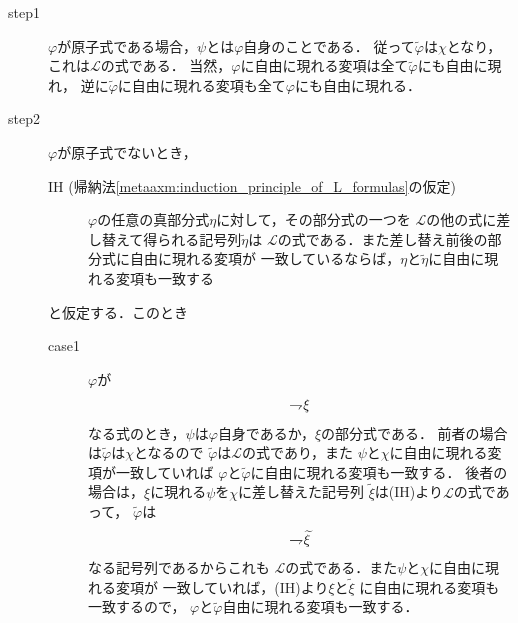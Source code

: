 	\begin{metaprf}\mbox{}
		\begin{description}
			\item[step1] $\varphi$が原子式である場合，$\psi$とは$\varphi$自身のことである．
				従って$\widetilde{\varphi}$は$\chi$となり，これは$\mathcal{L}$の式である．
				当然，$\varphi$に自由に現れる変項は全て$\widetilde{\varphi}$にも自由に現れ，
				逆に$\widetilde{\varphi}$に自由に現れる変項も全て$\varphi$にも自由に現れる．
							
			\item[step2] $\varphi$が原子式でないとき，
				\begin{description}
					\item[IH (帰納法\ref{metaaxm:induction_principle_of_L_formulas}の仮定)]
						$\varphi$の任意の真部分式$\eta$に対して，その部分式の一つを
						$\mathcal{L}$の他の式に差し替えて得られる記号列$\widetilde{\eta}$は
						$\mathcal{L}$の式である．また差し替え前後の部分式に自由に現れる変項が
						一致しているならば，$\eta$と$\widetilde{\eta}$に自由に現れる変項も一致する
				\end{description}
				と仮定する．このとき
				\begin{description}
					\item[case1] $\varphi$が
						\begin{align}
							\rightharpoondown\hspace{-0.25em} \xi
						\end{align}
						なる式のとき，$\psi$は$\varphi$自身であるか，$\xi$の部分式である．
						前者の場合は$\widetilde{\varphi}$は$\chi$となるので
						$\widetilde{\varphi}$は$\mathcal{L}$の式であり，また
						$\psi$と$\chi$に自由に現れる変項が一致していれば
						$\varphi$と$\widetilde{\varphi}$に自由に現れる変項も一致する．
						後者の場合は，$\xi$に現れる$\psi$を$\chi$に差し替えた記号列
						$\widetilde{\xi}$は(IH)より$\mathcal{L}$の式であって，
						$\widetilde{\varphi}$は
						\begin{align}
							\rightharpoondown\hspace{-0.25em} \widetilde{\xi}
						\end{align}
						なる記号列であるからこれも
						$\mathcal{L}$の式である．また$\psi$と$\chi$に自由に現れる変項が
						一致していれば，(IH)より$\xi$と$\widetilde{\xi}$
						に自由に現れる変項も一致するので，
						$\varphi$と$\widetilde{\varphi}$自由に現れる変項も一致する．
					

\end{description}
\end{description}
\end{metaprf}
